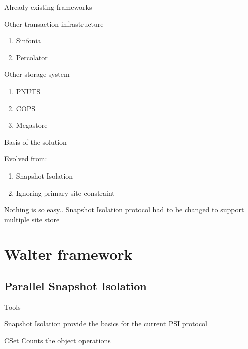\documentclass{beamer}
\begin{document}
		\begin{frame}{Already existing frameworks}
		
			Other transaction infrastructure					
		
			\begin{enumerate}
			\item Sinfonia
			\item Percolator
			\end{enumerate}						
					
			Other storage system
			\begin{enumerate}
			\item PNUTS
			\item COPS
			\item Megastore
			\end{enumerate}		

		\end{frame}
	
		\begin{frame}{Basis of the solution}

			Evolved from:
			\begin{enumerate}
			\item Snapshot Isolation
			\item Ignoring primary site constraint
			\end{enumerate}

			\begin{alertblock}{Nothing is so easy..}
				Snapshot Isolation protocol had to be changed to support multiple site store
			\end{alertblock}
						
		\end{frame}		

\section{Walter framework}

	\subsection{Parallel Snapshot Isolation}
		\begin{frame}{Tools}
		
		
			Snapshot Isolation provide the basics for the current PSI protocol
			
			CSet Counts the object operations
		
		\end{frame}
		
\end{document}
